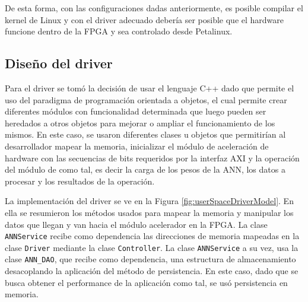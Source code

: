 De esta forma, con las configuraciones dadas anteriormente, es posible compilar el kernel de Linux y con el driver adecuado debería ser posible que el hardware funcione dentro de la FPGA y sea controlado desde Petalinux.

\subsection{Diseño del driver}
Para el driver se tomó la decisión de usar el lenguaje C++ dado que permite el uso del paradigma de programación orientada a objetos, el cual permite crear diferentes módulos con funcionalidad determinada que luego pueden ser heredados a otros objetos para mejorar o ampliar el funcionamiento de los mismos. En este caso, se usaron diferentes clases u objetos que permitirían al desarrollador mapear la memoria, inicializar el módulo de aceleración de hardware con las secuencias de bits requeridos por la interfaz AXI y la operación del módulo de como tal, es decir la carga de los pesos de la ANN, los datos a procesar y los resultados de la operación.


La implementación del driver se ve en la Figura \ref{fig:userSpaceDriverModel}. En ella se resumieron los métodos usados para mapear la memoria y manipular los datos que llegan y van hacia el módulo acelerador en la FPGA. La clase \texttt{ANNService} recibe como dependencia las direcciones de memoria mapeadas en la clase \texttt{Driver} mediante la clase \texttt{Controller}. La clase \texttt{ANNService} a su vez, usa la clase \texttt{ANN\_DAO}, que recibe como dependencia, una estructura de almacenamiento desacoplando la aplicación del método de persistencia. En este caso, dado que se busca obtener el performance de la aplicación como tal, se usó persistencia en memoria.

